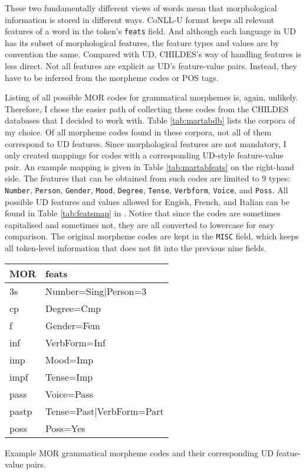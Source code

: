 These two fundamentally different views of words mean that morphological information is stored in different ways. CoNLL-U format keeps all relevant features of a word in the token's \texttt{feats} field. And although each language in UD has its subset of morphological features, the feature types and values are by convention the same. Compared with UD, CHILDES's way of handling features is less direct. Not all features are explicit as UD's feature-value pairs. Instead, they have to be inferred from the morpheme codes or POS tags.

Listing of all possible MOR codes for grammatical morphemes is, again, unlikely. Therefore, I chose the easier path of collecting these codes from the CHILDES databases that I decided to work with. Table \ref{tab:martabdb} lists the corpora of my choice. Of all morpheme codes found in these corpora, not all of them correspond to UD features. Since morphological features are not mandatory, I only created mappings for codes with a corresponding UD-style feature-value pair. An example mapping is given in Table \ref{tab:martabfeats} on the right-hand side. The features that can be obtained from such codes are limited to 9 types: \texttt{Number}, \texttt{Person}, \texttt{Gender}, \texttt{Mood}, \texttt{Degree}, \texttt{Tense}, \texttt{Verbform}, \texttt{Voice}, and \texttt{Poss}. All possible UD features and values allowed for Engish, French, and Italian can be found in Table \ref{tab:featsmap} in . Notice that since the codes are sometimes capitalised and sometimes not, they are all converted to lowercase for easy comparison. The original morpheme codes are kept in the \texttt{MISC} field, which keeps all token-level information that does not fit into the previous nine fields.

\begin{margintable}[1\baselineskip]
\begin{tabularx}{1\textwidth}{@{}ll@{}}
\toprule
\textbf{MOR} & \textbf{feats}\\ \midrule
	3s & Number=Sing|Person=3\\
	cp & Degree=Cmp\\
	f & Gender=Fem\\
	inf & VerbForm=Inf\\
	imp & Mood=Imp\\
	impf & Tense=Imp\\
	pass & Voice=Pass\\
	pastp & Tense=Past|VerbForm=Part\\
	poss & Poss=Yes\\\bottomrule
\end{tabularx}
\caption{\label{tab:martabfeats}Example MOR grammatical morpheme codes and their corresponding UD featue-value pairs.}
\footnotesize
\end{margintable}


